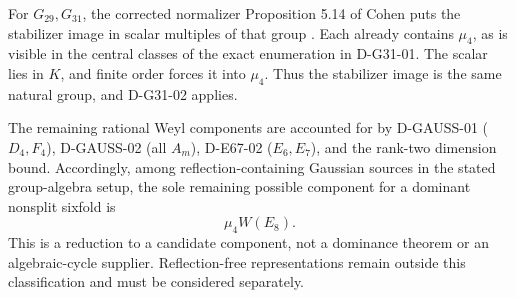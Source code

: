 For \(G_{29},G_{31}\), the corrected normalizer Proposition 5.14
of Cohen puts the stabilizer image in scalar multiples of that group
\cite{FIELD:Cohen,FIELD:CohenErr}. Each already contains \(\mu_4\),
as is visible in the central classes of the exact enumeration in
D-G31-01. The scalar lies in \(K\), and finite order forces it
into \(\mu_4\). Thus the stabilizer image is the same natural
group, and D-G31-02 applies.

The remaining rational Weyl components are accounted for by
D-GAUSS-01 (\(D_4,F_4\)), D-GAUSS-02 (all \(A_m\)),
D-E67-02 (\(E_6,E_7\)), and the rank-two dimension bound.
Accordingly, among reflection-containing Gaussian sources in the stated
group-algebra setup, the sole remaining possible component for a
dominant nonsplit sixfold is
\[
                              \mu_4W(E_8).
\]
This is a reduction to a candidate component, not a dominance theorem
or an algebraic-cycle supplier. Reflection-free representations remain
outside this classification and must be considered separately.
